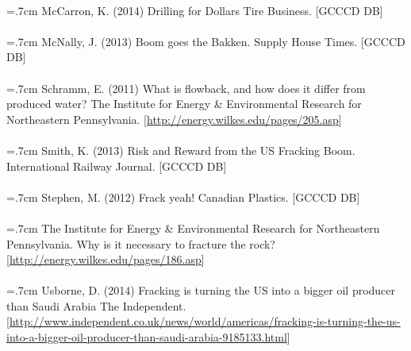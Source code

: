 \documentclass{article}
\begin{document}
  \paragraph{} \hangindent=.7cm McCarron, K. (2014) Drilling for Dollars Tire Business. [GCCCD DB]

  \paragraph{} \hangindent=.7cm McNally, J. (2013) Boom goes the Bakken. Supply House Times. [GCCCD DB]

  \paragraph{} \hangindent=.7cm Schramm, E. (2011) What is flowback, and how does it differ from produced water? The Institute for Energy \& Environmental Research for Northeastern Pennsylvania. [\url{http://energy.wilkes.edu/pages/205.asp}]

  \paragraph{} \hangindent=.7cm Smith, K. (2013) Risk and Reward from the US Fracking Boom. International Railway Journal. [GCCCD DB]

  \paragraph{} \hangindent=.7cm Stephen, M. (2012) Frack yeah! Canadian Plastics. [GCCCD DB]

  \paragraph{} \hangindent=.7cm The Institute for Energy \& Environmental Research for Northeastern Pennsylvania. Why is it necessary to fracture the rock? [\url{http://energy.wilkes.edu/pages/186.asp}]
  
  \paragraph{} \hangindent=.7cm Usborne, D. (2014) Fracking is turning the US into a bigger oil producer than Saudi Arabia The Independent. [\url{http://www.independent.co.uk/news/world/americas/fracking-is-turning-the-us-into-a-bigger-oil-producer-than-saudi-arabia-9185133.html}]
\end{document}
